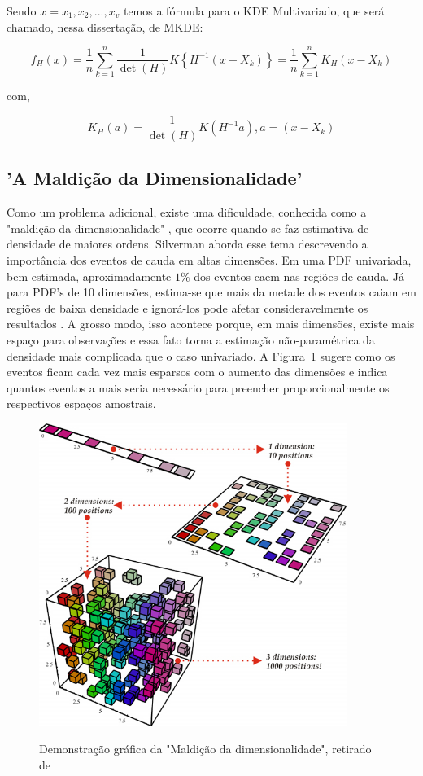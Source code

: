 Sendo $x = {x_1, x_2, ..., x_v}$ temos a fórmula para o KDE Multivariado, que será chamado, nessa dissertação, de \ac{MKDE}:

\begin{equation}\label{eq:41}
  {f_H}\left( x \right) = \frac{1}{n}\mathop \sum \limits_{k = 1}^{n} \frac{1}{{\det (H)}}K\left\{ {{H^{ - 1}}(x - {X_k})} \right\} = \frac{1}{n}\mathop \sum \limits_{k = 1}^{n} {K_H}(x - {X_k})
\end{equation}

com,

\begin{equation}\label{eq:42}
  {K_H}\left( a \right) = \frac{1}{{\det (H)}}K\left( {{H^{ - 1}}a} \right),a = (x - {X_k})
\end{equation}

\subsection{'A Maldição da Dimensionalidade'} \label{sec:maldicao}

Como um problema adicional, existe uma dificuldade, conhecida como a "maldição da dimensionalidade" \cite{narsky2013statistical}, que ocorre quando se faz estimativa de densidade de maiores ordens. Silverman \cite{silverman1986density} aborda esse tema descrevendo a importância dos eventos de cauda em altas dimensões. Em uma PDF univariada, bem estimada, aproximadamente $1\%$ dos eventos caem nas regiões de cauda. Já para PDF's de 10 dimensões, estima-se que mais da metade dos eventos caiam em regiões de baixa densidade e ignorá-los pode afetar consideravelmente os resultados \cite{kernelthesis}. A grosso modo, isso acontece porque, em mais dimensões, existe mais espaço para observações e essa fato torna a estimação não-paramétrica da densidade mais complicada que o caso univariado. A Figura~\ref{fig:4T01} sugere como os eventos ficam cada vez mais esparsos com o aumento das dimensões e indica quantos eventos a mais seria necessário para preencher proporcionalmente os respectivos espaços amostrais.


\begin{figure}[h!]
	\centering
	\includegraphics[width=10cm]{./textuais/desenvolvimento/figuras/CurseDimensionality.png}\\
	\caption{Demonstração gráfica da "Maldição da dimensionalidade", retirado de \cite{cursedimen}}
	\label{fig:4T01}
\end{figure}

